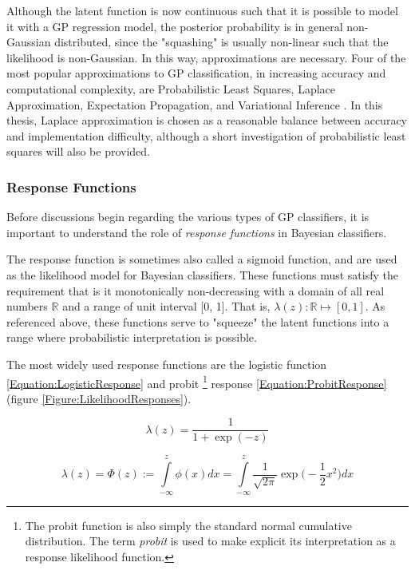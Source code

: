			Although the latent function is now continuous such that it is possible to model it with a GP regression model, the posterior probability is in general non-Gaussian distributed, since the "squashing" is usually non-linear such that the likelihood is non-Gaussian. In this way, approximations are necessary. Four of the most popular approximations to GP classification, in increasing accuracy and computational complexity, are Probabilistic Least Squares, Laplace Approximation, Expectation Propagation, and Variational Inference \citep{GaussianProcessForMachineLearning}. In this thesis, Laplace approximation is chosen as a reasonable balance between accuracy and implementation difficulty, although a short investigation of probabilistic least squares will also be provided.
			
			\subsubsection{Response Functions}
			\label{Background:GaussianProcesses:Classification:ResponseFunction}
			
				Before discussions begin regarding the various types of GP classifiers, it is important to understand the role of \textit{response functions} in Bayesian classifiers.
				
				The response function is sometimes also called a sigmoid function, and are used as the likelihood model for Bayesian classifiers. These functions must satisfy the requirement that is it monotonically non-decreasing with a domain of all real numbers $\mathbb{R}$ and a range of unit interval [0, 1]. That is, $\lambda(z): \mathbb{R} \mapsto [0, 1]$. As referenced above, these functions serve to "squeeze" the latent functions into a range where probabilistic interpretation is possible.
				
				The most widely used response functions are the logistic function \eqref{Equation:LogisticResponse} and probit \footnote{The probit function is also simply the standard normal cumulative distribution. The term \textit{probit} is used to make explicit its interpretation as a response likelihood function.} response \eqref{Equation:ProbitResponse} (figure \ref{Figure:LikelihoodResponses}).
				
				\begin{equation}
					\lambda(z) = \frac{1}{1 + \exp(-z)}
				\label{Equation:LogisticResponse}
				\end{equation}
				
				\begin{equation}
					\lambda(z) = \Phi(z) := \int\limits_{-\infty}^{z} \phi(x) dx =  \int\limits_{-\infty}^{z} \frac{1}{\sqrt{2 \pi}} \exp\Big(- \frac{1}{2} x^{2}\Big) dx
				\label{Equation:ProbitResponse}
				\end{equation}
			
